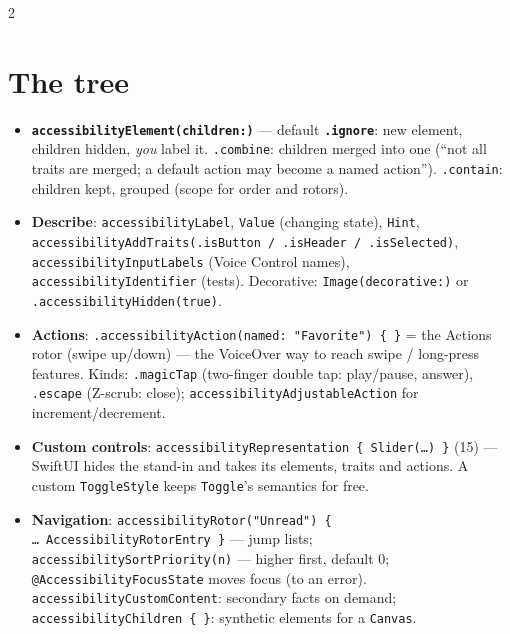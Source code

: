 \documentclass[8pt]{extarticle}
\begin{document}



\begin{multicols}{2}
\raggedright

\section{The tree}
\begin{itemize}
  \item \textbf{\texttt{accessibilityElement(children:)}} — default \textbf{\texttt{.ignore}}: new element,
        children hidden, \emph{you} label it. \texttt{.combine}: children merged into one (``not all traits are
        merged; a default action may become a named action''). \texttt{.contain}: children kept, grouped
        (scope for order and rotors).
  \item \textbf{Describe}: \texttt{accessibilityLabel}, \texttt{Value} (changing state), \texttt{Hint},
        \texttt{accessibilityAddTraits(.isButton / .isHeader / .isSelected)}, \texttt{accessibilityInputLabels}
        (Voice Control names), \texttt{accessibilityIdentifier} (tests). Decorative:
        \texttt{Image(decorative:)} or \texttt{.accessibilityHidden(true)}.
  \item \textbf{Actions}: \texttt{.accessibilityAction(named: "Favorite") \{ \}} = the Actions rotor (swipe
        up/down) — the VoiceOver way to reach swipe / long-press features. Kinds: \texttt{.magicTap}
        (two-finger double tap: play/pause, answer), \texttt{.escape} (Z-scrub: close);
        \texttt{accessibilityAdjustableAction} for increment/decrement.
  \item \textbf{Custom controls}: \texttt{accessibilityRepresentation \{ Slider(\ldots) \}} (15) — SwiftUI
        hides the stand-in and takes its elements, traits and actions. A custom \texttt{ToggleStyle} keeps
        \texttt{Toggle}'s semantics for free.
  \item \textbf{Navigation}: \texttt{accessibilityRotor("Unread") \{ \ldots\ AccessibilityRotorEntry \}} —
        jump lists; \texttt{accessibilitySortPriority(n)} — higher first, default 0;
        \texttt{@AccessibilityFocusState} moves focus (to an error). \texttt{accessibilityCustomContent}:
        secondary facts on demand; \texttt{accessibilityChildren \{ \}}: synthetic elements for a \texttt{Canvas}.
\end{itemize}


\end{multicols}
\end{document}
